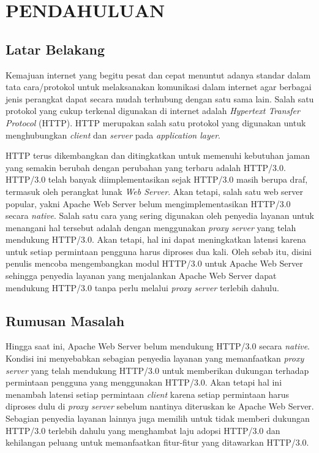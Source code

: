 \cleardoublepage %
\chapter{PENDAHULUAN}
\label{chap:pendahuluan}
\section{Latar Belakang}
Kemajuan internet yang begitu pesat dan cepat menuntut adanya standar dalam tata cara/protokol untuk melaksanakan komunikasi dalam internet agar berbagai jenis perangkat dapat secara mudah terhubung dengan satu sama lain. Salah satu protokol yang cukup terkenal digunakan di internet adalah \textit{Hypertext Transfer Protocol} (HTTP). HTTP merupakan salah satu protokol yang digunakan untuk menghubungkan \textit{client} dan \textit{server} pada \textit{application layer}.

HTTP terus dikembangkan dan ditingkatkan untuk memenuhi kebutuhan jaman yang semakin berubah dengan perubahan yang terbaru adalah HTTP/3.0. HTTP/3.0 telah banyak diimplementasikan sejak HTTP/3.0 masih berupa draf, termasuk oleh perangkat lunak \textit{Web Server}. Akan tetapi, salah satu web server popular, yakni Apache Web Server belum mengimplementasikan HTTP/3.0 secara \textit{native}. Salah satu cara yang sering digunakan oleh penyedia layanan untuk menangani hal tersebut adalah dengan menggunakan \textit{proxy server} yang telah mendukung HTTP/3.0. Akan tetapi, hal ini dapat meningkatkan latensi karena untuk setiap permintaan pengguna harus diproses dua kali. Oleh sebab itu, disini penulis mencoba mengembangkan modul HTTP/3.0 untuk Apache Web Server sehingga penyedia layanan yang menjalankan Apache Web Server dapat mendukung HTTP/3.0 tanpa perlu melalui \textit{proxy server} terlebih dahulu.
\section{Rumusan Masalah}
Hingga saat ini, Apache Web Server belum mendukung HTTP/3.0 secara \textit{native}. Kondisi ini menyebabkan sebagian penyedia layanan yang memanfaatkan \textit{proxy server} yang telah mendukung HTTP/3.0 untuk memberikan dukungan terhadap permintaan pengguna yang menggunakan HTTP/3.0. Akan tetapi hal ini menambah latensi setiap permintaan \textit{client} karena setiap permintaan harus diproses dulu di \textit{proxy server} sebelum nantinya diteruskan ke Apache Web Server. Sebagian penyedia layanan lainnya juga memilih untuk tidak memberi dukungan HTTP/3.0 terlebih dahulu yang menghambat laju adopsi HTTP/3.0 dan kehilangan peluang untuk memanfaatkan fitur-fitur yang ditawarkan HTTP/3.0.

